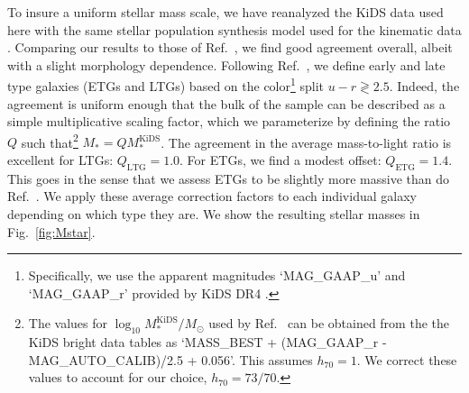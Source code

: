 \documentclass[a4paper,11pt]{article}
\begin{document}
To insure a uniform stellar mass scale, we have reanalyzed the KiDS data used here with the same stellar population synthesis model \citep{Schombert2014} used for the kinematic data \citep{Lelli2017b}. Comparing our results to those of Ref.~\cite{Brouwer2021}, we find good agreement overall, albeit with a slight morphology dependence. Following Ref.~\cite{Brouwer2021}, we define early and late type galaxies (ETGs and LTGs) based on the color\footnote{Specifically, we use the apparent magnitudes `MAG\_GAAP\_u' and `MAG\_GAAP\_r' provided by KiDS DR4 \citep{Kuijken2019}.}  split $u-r \gtrless 2.5$. Indeed, the agreement is uniform enough that the bulk of the sample can be described as a simple multiplicative scaling factor, which we parameterize by defining the ratio $Q$ such that\footnote{
  The values for $\log_{10} M_\ast^{\mathrm{KiDS}}/M_\odot$ used by Ref.~\cite{Brouwer2021} can be obtained from the the KiDS bright data tables as `MASS\_BEST + (MAG\_GAAP\_r - MAG\_AUTO\_CALIB)/2.5 + 0.056'.
  This assumes $h_{70} = 1$.
  We correct these values to account for our choice, $h_{70} = 73/70$.
} $M_\ast = Q M_\ast^{\mathrm{KiDS}}$.
The agreement in the average mass-to-light ratio is excellent for LTGs: $Q_{\mathrm{LTG}}=1.0$.
For ETGs, we find a modest offset: $Q_{\mathrm{ETG}} = 1.4$. This goes in the sense that we assess ETGs to be slightly more massive than do Ref.~\cite{Brouwer2021}.
We apply these average correction factors to each individual galaxy depending on which type they are.
We show the resulting stellar masses in Fig.~\ref{fig:Mstar}.
\end{document}
